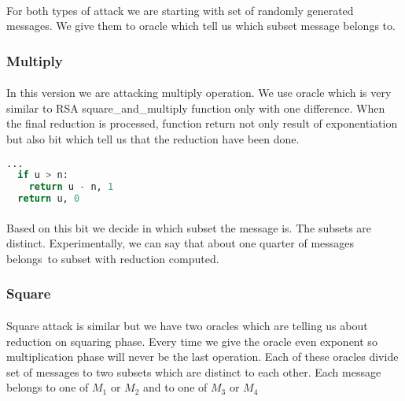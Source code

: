 \documentclass[thesis=B,english]{FITthesis}[2012/10/20]
\begin{document}
{\paragraph*{}{ 
For both types of attack we are starting with set of randomly generated messages. We give them to oracle which tell us which subset message belongs to.

}

\subsubsection{Multiply}
\paragraph*{}{
In this version we are attacking multiply operation. We use oracle which is very similar to RSA square\_and\_multiply function only with one difference.
When the final reduction is processed, function return not only result of exponentiation but also bit which tell us that the reduction have been done.}

\begin{lstlisting}[language=Python]
  ...
  if u > n:
    return u - n, 1
  return u, 0
\end{lstlisting}

\paragraph*{}
{
Based on this bit we decide in which subset the message is. The subsets are distinct. Experimentally, we can say that about one quarter of messages belongs~to
subset with reduction computed.
}
\subsubsection{Square}
\paragraph*{}{
Square attack is similar but we have two oracles which are telling us about reduction on squaring phase. Every time we give the oracle even exponent so 
multiplication phase will never be the last operation. Each of these oracles divide set of messages to two subsets which are distinct to each other. Each message 
belongs to one of \(M_1\) or \(M_2\) and to one of \(M_3\) or \(M_4\)
}

}
\end{document}
